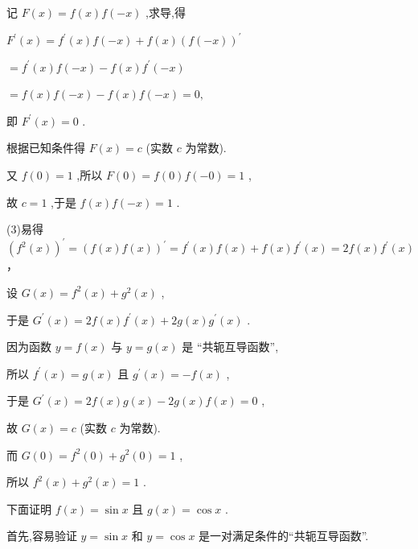 \documentclass[10pt]{article}
\begin{document}
记 \(F\left( x\right)  = f\left( x\right) f\left( {-x}\right)\) ,求导,得

\({F}^{\prime }\left( x\right)  = {f}^{\prime }\left( x\right) f\left( {-x}\right)  + f\left( x\right) {\left( f\left( -x\right) \right) }^{\prime }\)

\(= {f}^{\prime }\left( x\right) f\left( {-x}\right)  - f\left( x\right) {f}^{\prime }\left( {-x}\right)\)

\(= f\left( x\right) f\left( {-x}\right)  - f\left( x\right) f\left( {-x}\right)  = 0,\)

即 \({F}^{\prime }\left( x\right)  = 0\) .

根据已知条件得 \(F\left( x\right)  = c\) (实数 \(c\) 为常数).

又 \(f\left( 0\right)  = 1\) ,所以 \(F\left( 0\right)  = f\left( 0\right) f\left( {-0}\right)  = 1\) ,

故 \(c = 1\) ,于是 \(f\left( x\right) f\left( {-x}\right)  = 1\) .

(3)易得 \({\left( {f}^{2}\left( x\right) \right) }^{\prime } = {\left( f\left( x\right) f\left( x\right) \right) }^{\prime } = {f}^{\prime }\left( x\right) f\left( x\right)  + f\left( x\right) {f}^{\prime }\left( x\right)  = {2f}\left( x\right) {f}^{\prime }\left( x\right)\) ，

设 \(G\left( x\right)  = {f}^{2}\left( x\right)  + {g}^{2}\left( x\right)\) ,

于是 \({G}^{\prime }\left( x\right)  = {2f}\left( x\right) {f}^{\prime }\left( x\right)  + {2g}\left( x\right) {g}^{\prime }\left( x\right)\) .

因为函数 \(y = f\left( x\right)\) 与 \(y = g\left( x\right)\) 是 “共轭互导函数”,

所以 \({f}^{\prime }\left( x\right)  = g\left( x\right)\) 且 \({g}^{\prime }\left( x\right)  =  - f\left( x\right)\) ,

于是 \({G}^{\prime }\left( x\right)  = {2f}\left( x\right) g\left( x\right)  - {2g}\left( x\right) f\left( x\right)  = 0\) ,

故 \(G\left( x\right)  = c\) (实数 \(c\) 为常数).

而 \(G\left( 0\right)  = {f}^{2}\left( 0\right)  + {g}^{2}\left( 0\right)  = 1\) ,

所以 \({f}^{2}\left( x\right)  + {g}^{2}\left( x\right)  = 1\) .

下面证明 \(f\left( x\right)  = \sin x\) 且 \(g\left( x\right)  = \cos x\) .

首先,容易验证 \(y = \sin x\) 和 \(y = \cos x\) 是一对满足条件的“共轭互导函数”.
\end{document}
